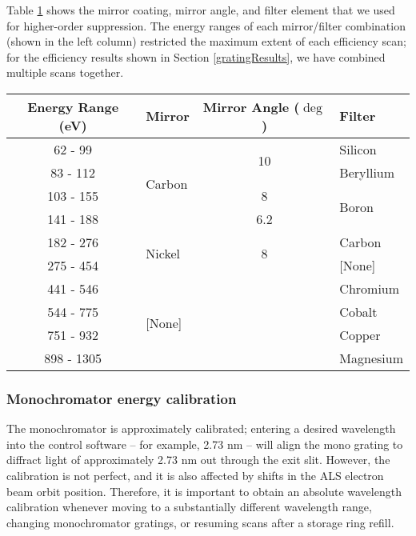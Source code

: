 Table \ref{filterTable} shows the mirror coating, mirror angle, and filter element that we used for higher-order suppression.  The energy ranges of each mirror/filter combination (shown in the left column) restricted the maximum extent of each efficiency scan; for the efficiency results shown in Section \ref{gratingResults}, we have combined multiple scans together.

\begin{table}[htbp]
   \centering
   \begin{tabular}{@{} c l c l @{}} %
\toprule
Energy Range	(eV) &	Mirror	&	Mirror Angle ($\deg$)	&	Filter	\\
\midrule
62 - 99	&	\multirow{4}{*}{Carbon}	&	\multirow{2}{*}{10}	&	Silicon	\\
83 - 112	&			&			&	Beryllium	\\
\cmidrule(l){3-4}
103 - 155	&			&	8	&	\multirow{2}{*}{Boron}	\\
141 - 188	&			&	6.2	&			\\
\midrule
182 - 276	&	\multirow{2}{*}{Nickel}	&	\multirow{2}{*}{8}	&	Carbon	\\
275 - 454	&			&			&	[None]	\\
\midrule
441 - 546	&	\multirow{4}{*}{[None]}	&		&	Chromium	\\
544 - 775	&			&		&	Cobalt	\\
751 - 932	&			&		&	Copper	\\
898 -  1305&			&		&	Magnesium	\\
\bottomrule
   \end{tabular}
   \label{filterTable}
\end{table}

\subsubsection{Monochromator energy calibration}
The monochromator is approximately calibrated; entering a desired wavelength into the control software -- for example, 2.73 nm -- will align the mono grating to diffract light of approximately 2.73 nm out through the exit slit.  However, the calibration is not perfect, and it is also affected by shifts in the ALS electron beam orbit position.  Therefore, it is important to obtain an absolute wavelength calibration whenever moving to a substantially different wavelength range, changing monochromator gratings, or resuming scans after a storage ring refill.

